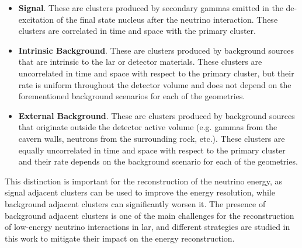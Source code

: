 \begin{itemize}
    \item \textbf{Signal}. These are clusters produced by secondary gammas emitted in the de-excitation of the final state nucleus after the neutrino interaction. These clusters are correlated in time and space with the primary cluster.
    \item \textbf{Intrinsic Background}. These are clusters produced by background sources that are intrinsic to the \gls{lar} or detector materials. These clusters are uncorrelated in time and space with respect to the primary cluster, but their rate is uniform throughout the detector volume and does not depend on the forementioned background scenarios for each of the geometries.
    \item \textbf{External Background}. These are clusters produced by background sources that originate outside the detector active volume (e.g. gammas from the cavern walls, neutrons from the surrounding rock, etc.). These clusters are equally uncorrelated in time and space with respect to the primary cluster and their rate depends on the background scenario for each of the geometries.
\end{itemize}

This distinction is important for the reconstruction of the neutrino energy, as signal adjacent clusters can be used to improve the energy resolution, while background adjacent clusters can significantly worsen it. The presence of background adjacent clusters is one of the main challenges for the reconstruction of low-energy neutrino interactions in \gls{lar}, and different strategies are studied in this work to mitigate their impact on the energy reconstruction.